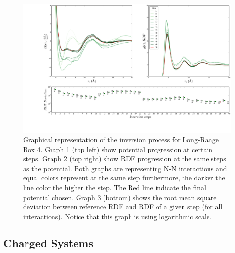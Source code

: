 \documentclass[10pt,a4paper,twoside]{article}
\begin{document}
\begin{figure}[H]
  \begin{center}
	\includegraphics[width=.8 \textwidth]{./graphs/Conv100n}
	\caption{\small{Graphical representation of the inversion process for Long-Range Box 4. Graph 1 (top left) show potential progression at certain steps. Graph 2 (top right) show RDF progression at the same steps as the potential. Both graphs are representing N-N interactions and equal colors represent at the same step furthermore, the darker the line color the higher the step. The Red line indicate the final potential chosen.  Graph 3 (bottom) shows the root mean square deviation between reference RDF and RDF of a given step (for all interactions). Notice that this graph is using logarithmic scale.}}
	\label{Fig:Conv100n}
  \end{center}
\end{figure}

\subsection{Charged Systems}
\end{document}
